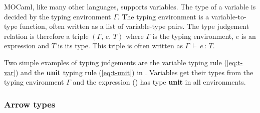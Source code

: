 \documentclass[12pt,twoside,notitlepage]{report}
\theoremstyle{plain}%
\theoremstyle{definition}
\theoremstyle{remark}
\begin{document}
MOCaml, like many other languages, supports variables. The type of a variable is decided by the typing environment $ \Gamma $. The typing environment is a variable-to-type function, often written as a list of variable-type pairs. The type judgement relation is therefore a triple $ (\Gamma,\,e,\,T) $ where $ \Gamma $ is the typing environment, $ e $ is an expression and $ T $ is its type. This triple is often written as $ \Gamma\,\vdash\,e\,:\,T $. 

Two simple examples of typing judgements are the variable typing rule (\ref{eq:t-var}) and the \textbf{unit} typing rule (\ref{eq:t-unit}) in . Variables get their types from the typing environment $ \Gamma $ and the expression () has type \textbf{unit} in all environments.
\subsubsection{Arrow types}
\end{document}
